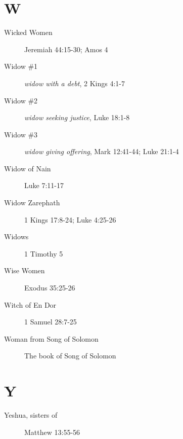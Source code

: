 \documentclass[12pt,letter,twoside,openany]{extbook}
\begin{document}
\chapter*{W}
\begin{description}
	\item [Wicked Women] Jeremiah 44:15-30; Amos 4
	\item [Widow \#1] \textit{widow with a debt}, 2 Kings 4:1-7
	\item [Widow \#2] \textit{widow seeking justice}, Luke 18:1-8
	\item [Widow \#3] \textit{widow giving offering}, Mark 12:41-44; Luke 21:1-4
	\item [Widow of Nain] Luke 7:11-17
	\item [Widow Zarephath] 1 Kings 17:8-24; Luke 4:25-26
	\item [Widows] 1 Timothy 5
	\item [Wise Women] Exodus 35:25-26
	\item [Witch of En Dor] 1 Samuel 28:7-25
	\item [Woman from Song of Solomon] The book of Song of Solomon
\end{description}

%

\chapter*{Y}
\begin{description}
	\item [Yeshua, sisters of\protect\footnotemark] Matthew 13:55-56
\end{description}
\end{document}
